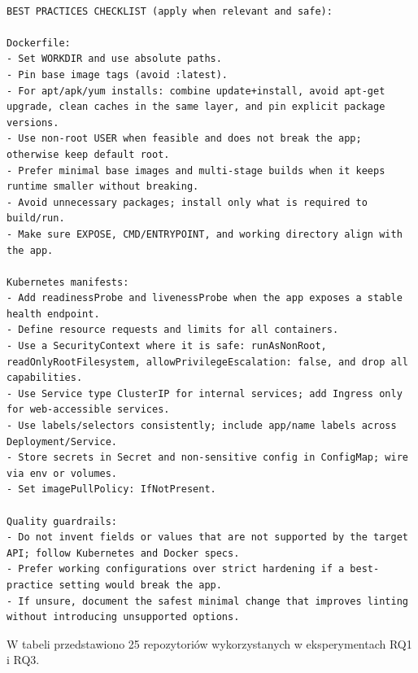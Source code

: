 \documentclass[
    bindingoffset=5mm,  %
    footnoteindent=3mm, %
    hyphenation=true    %
]{src/wut-thesis}
\begin{document}
\begin{verbatim}

BEST PRACTICES CHECKLIST (apply when relevant and safe):

Dockerfile:
- Set WORKDIR and use absolute paths.
- Pin base image tags (avoid :latest).
- For apt/apk/yum installs: combine update+install, avoid apt-get upgrade, clean caches in the same layer, and pin explicit package versions.
- Use non-root USER when feasible and does not break the app; otherwise keep default root.
- Prefer minimal base images and multi-stage builds when it keeps runtime smaller without breaking.
- Avoid unnecessary packages; install only what is required to build/run.
- Make sure EXPOSE, CMD/ENTRYPOINT, and working directory align with the app.

Kubernetes manifests:
- Add readinessProbe and livenessProbe when the app exposes a stable health endpoint.
- Define resource requests and limits for all containers.
- Use a SecurityContext where it is safe: runAsNonRoot, readOnlyRootFilesystem, allowPrivilegeEscalation: false, and drop all capabilities.
- Use Service type ClusterIP for internal services; add Ingress only for web-accessible services.
- Use labels/selectors consistently; include app/name labels across Deployment/Service.
- Store secrets in Secret and non-sensitive config in ConfigMap; wire via env or volumes.
- Set imagePullPolicy: IfNotPresent.

Quality guardrails:
- Do not invent fields or values that are not supported by the target API; follow Kubernetes and Docker specs.
- Prefer working configurations over strict hardening if a best-practice setting would break the app.
- If unsure, document the safest minimal change that improves linting without introducing unsupported options.

\end{verbatim}

\label{att:h1-dataset}

W tabeli przedstawiono 25 repozytoriów wykorzystanych w eksperymentach RQ1 i RQ3.
\end{document}
